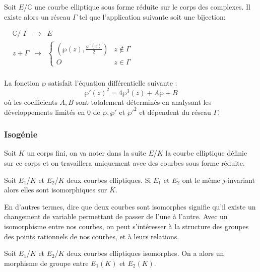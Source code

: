 \documentclass[12pt]{article}
\begin{document}
\begin{thm}
Soit $E$/$\mathbb{C}$ une courbe elliptique sous forme réduite sur le corps des complexes. Il existe alors un réseau $\Gamma$ tel que l'application suivante soit une bijection:
\newline
\medskip


$\begin{array}{cccc}
& \mathbb{C}\text{/ }\Gamma & \to & E \\
& z + \Gamma & \mapsto & \left\lbrace
\begin{array}{cc}
 (\wp(z), \frac{{\wp'}(z)}{2})  & z \notin \Gamma \\
 O & z \in \Gamma
\end{array}\right.\\
\end{array}$
\end{thm}

\begin{thm}
La fonction $\wp$ satisfait l'équation différentielle suivante : 
\begin{equation*}
{\wp'}(z)^2 = 4\wp^3(z) + A \wp + B
\end{equation*}
où les coefficients $A,B$ sont totalement déterminés en analysant les développements limités en $0$ de $\wp, {\wp'}$ et ${\wp'}^2$ et dépendent du réseau $\Gamma$.
\end{thm}

\subsubsection{Isogénie}
Soit $K$ un corps fini, on va noter dans la suite $E$/$K$ la courbe elliptique définie sur ce corps et on travaillera uniquement avec des courbes sous forme réduite.

\begin{defi}
Soit $E_1$/$K$ et $E_2$/$K$ deux courbes elliptiques. Si $E_1$ et $E_2$ ont le même $j$-invariant alors elles sont isomorphiques sur $\bar{K}$. 
\end{defi}
En d'autres termes, dire que deux courbes sont isomorphes signifie qu'il existe un changement de variable permettant de passer de l'une à l'autre. Avec un isomorphisme entre nos courbes, on peut s'intéresser à la structure des groupes des points rationnels de nos courbes, et à leurs relations.

\begin{prop}
Soit $E_1$/$K$ et $E_2$/$K$ deux courbes elliptiques isomorphes. On a alors un morphisme de groupe entre $E_1(K)$ et $E_2(K)$.
\end{prop}
\end{document}
